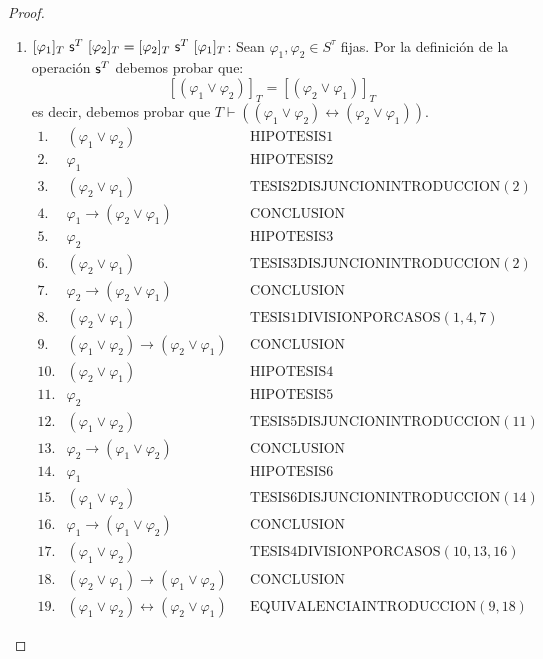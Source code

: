 \begin{proof}
\begin{enumerate}[(1)]
      \item $[\varphi_{1}]_{T} \ \SU^{T} \ [\varphi_{2}]_{T} = [\varphi_{2}]_{T} \ \SU^{T} \ [\varphi_{1}]_{T}$: Sean
        $\varphi_{1}, \varphi_{2} \in S^{\tau}$ fijas. Por la definición de la operación $\mathsf{s}^{T}$ debemos probar que:
        \[
          [(\varphi_{1} \vee \varphi_{2})]_{T} = [(\varphi_{2} \vee \varphi_{1})]_{T}
        \]
        \PN es decir, debemos probar que $T \vdash ((\varphi_{1} \vee \varphi_{2}) \leftrightarrow (\varphi_{2} \vee
        \varphi_{1}))$.
        \[
          \begin{array}{llll}
            1. & (\varphi_{1} \vee \varphi_{2}) && \text{HIPOTESIS1} \\
            2. & \varphi_{1} && \text{HIPOTESIS2} \\
            3. & (\varphi_{2} \vee \varphi_{1}) && \text{TESIS2DISJUNCIONINTRODUCCION}(2) \\
            4. & \varphi_{1} \rightarrow (\varphi_{2} \vee \varphi_{1}) && \text{CONCLUSION} \\
            5. & \varphi_{2} && \text{HIPOTESIS3} \\
            6. & (\varphi_{2} \vee \varphi_{1}) && \text{TESIS3DISJUNCIONINTRODUCCION}(2) \\
            7. & \varphi_{2} \rightarrow (\varphi_{2} \vee \varphi_{1}) && \text{CONCLUSION} \\
            8. & (\varphi_{2} \vee \varphi_{1}) && \text{TESIS1DIVISIONPORCASOS}(1,4,7) \\
            9. & (\varphi_{1} \vee \varphi_{2}) \rightarrow (\varphi_{2} \vee \varphi_{1}) && \text{CONCLUSION} \\
            10. & (\varphi_{2} \vee \varphi_{1}) && \text{HIPOTESIS4} \\
            11. & \varphi_{2} && \text{HIPOTESIS5} \\
            12. & (\varphi_{1} \vee \varphi_{2}) && \text{TESIS5DISJUNCIONINTRODUCCION}(11) \\
            13. & \varphi_{2} \rightarrow (\varphi_{1} \vee \varphi_{2}) && \text{CONCLUSION} \\
            14. & \varphi_{1} && \text{HIPOTESIS6} \\
            15. & (\varphi_{1} \vee \varphi_{2}) && \text{TESIS6DISJUNCIONINTRODUCCION}(14) \\
            16. & \varphi_{1} \rightarrow (\varphi_{1} \vee \varphi_{2}) && \text{CONCLUSION} \\
            17. & (\varphi_{1} \vee \varphi_{2}) && \text{TESIS4DIVISIONPORCASOS}(10,13,16) \\
            18. & (\varphi_{2} \vee \varphi_{1}) \rightarrow (\varphi_{1} \vee \varphi_{2}) && \text{CONCLUSION} \\
            19. & (\varphi_{1} \vee \varphi_{2}) \leftrightarrow (\varphi_{2} \vee \varphi_{1}) &&
              \text{EQUIVALENCIAINTRODUCCION}(9,18)
          \end{array}
        \]


\end{enumerate}
\end{proof}
